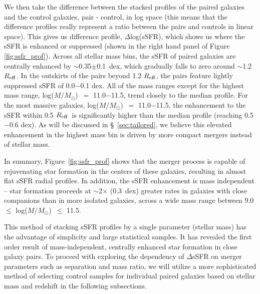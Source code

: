 \documentclass[iop,revtex4,twocolumn,apj,numberedappendix,appendixfloats]{emulateapj}
\newcommand{\reff}{$R_{\rm eff}$}
\newcommand{\logm}{log($M/M_{\odot}$)}
\begin{document}
We then take the difference between the stacked profiles of the paired galaxies and the control galaxies, pair - control, in log space (this means that the difference profiles really represent a ratio between the pairs and controls in linear space). This gives us difference profile, $\Delta$log(sSFR), which shows us where the sSFR is enhanced or suppressed (shown in the right hand panel of Figure \ref{fig:ssfr_prof}). Across all stellar mass bins, the sSFR of paired galaxies are centrally enhanced by $\sim$0.35$\pm$0.1~dex, which gradually falls to zero around $\sim$1.2 \reff. In the outskirts of the pairs beyond 1.2 \reff, the pairs feature lightly suppressed sSFR of 0.0$-$0.1 dex. All of the mass ranges except for the highest mass range, \logm\ $=$ 11.0$-$11.5, trend closely to the median profile. For the most massive galaxies, \logm\ $=$ 11.0$-$11.5, the enhancement to the sSFR within 0.5 \reff\ is significantly higher than the median profile (reaching 0.5$-$0.6 dex). As will be discussed in \S~\ref{sec:tailored}, we believe this elevated enhancement in the highest mass bin is driven by more compact mergers instead of stellar mass. 

In summary, Figure~\ref{fig:ssfr_prof} shows that the merger process is capable of rejuvenating star formation in the centers of these galaxies, resulting in almost flat sSFR radial profiles. In addition, the sSFR enhancement is mass independent -- star formation proceeds at $\sim$2$\times$ (0.3~dex) greater rates in galaxies with close companions than in more isolated galaxies, across a wide mass range between 9.0 $\leq$ \logm\ $\leq$ 11.5.

This method of stacking sSFR profiles by a single parameter (stellar mass) has the advantage of simplicity and large statistical samples. It has revealed the first order result of mass-independent, centrally enhanced star formation in close galaxy pairs. To proceed with exploring the dependency of $\Delta$sSFR on merger parameters such as separation and mass ratio, we will utilize a more sophisticated method of selecting control samples for individual paired galaxies based on stellar mass and redshift in the following subsections.  
\end{document}
